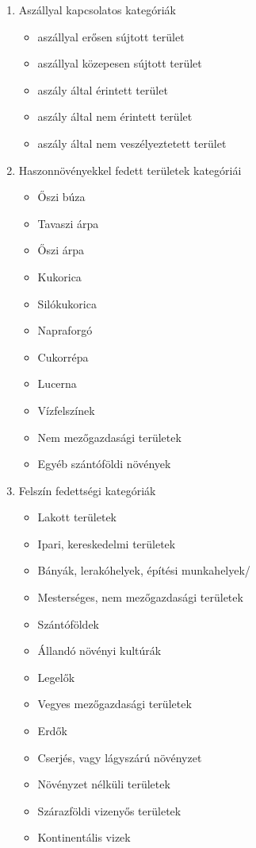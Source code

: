 \documentclass[a4paper,12pt]{article}
\begin{document}
\begin{enumerate}
	\item Aszállyal kapcsolatos kategóriák	
		\begin{itemize}
		\item aszállyal erősen sújtott terület
		\item aszállyal közepesen sújtott terület
		\item aszály által érintett terület
		\item aszály által nem érintett terület
		\item aszály által nem veszélyeztetett terület
		\end{itemize}
	
	\item Haszonnövényekkel fedett területek kategóriái
		\begin{itemize}
		\item Őszi búza
		\item Tavaszi árpa
		\item Őszi árpa
		\item Kukorica
		\item Silókukorica
		\item Napraforgó
		\item Cukorrépa
		\item Lucerna
		\item Vízfelszínek
		\item Nem mezőgazdasági területek
		\item Egyéb szántóföldi növények
		\end{itemize}
	
	\item Felszín fedettségi kategóriák
		\begin{itemize}
		\item Lakott területek
		\item Ipari, kereskedelmi területek
		\item Bányák, lerakóhelyek, építési munkahelyek/
		\item Mesterséges, nem mezőgazdasági területek
		\item Szántóföldek
		\item Állandó növényi kultúrák
		\item Legelők
		\item Vegyes mezőgazdasági területek
		\item Erdők
		\item Cserjés, vagy lágyszárú növényzet
		\item Növényzet nélküli területek
		\item Szárazföldi vizenyős területek
		\item Kontinentális vizek
		\end{itemize}
	

\end{enumerate}
\end{document}
